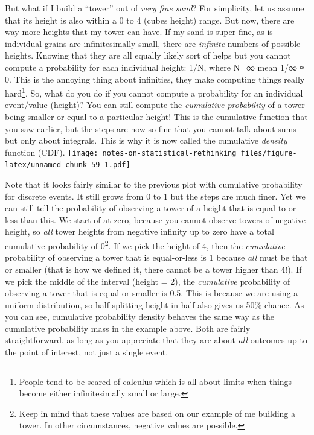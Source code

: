 \documentclass[
]{book}
\begin{document}
But what if I build a ``tower'' out of \emph{very fine sand}? For simplicity, let us assume that its height is also within a 0 to 4 (cubes height) range. But now, there are way more heights that my tower can have. If my sand is super fine, as is individual grains are infinitesimally small, there are \emph{infinite} numbers of possible heights. Knowing that they are all equally likely sort of helps but you cannot compute a probability for each individual height: 1/N, where N=∞ mean 1/∞ ≈ 0. This is the annoying thing about infinities, they make computing things really hard\footnote{People tend to be scared of calculus which is all about limits when things become either infinitesimally small or large.}. So, what do you do if you cannot compute a probability for an individual event/value (height)? You can still compute the \emph{cumulative probability} of a tower being smaller or equal to a particular height! This is the cumulative function that you saw earlier, but the steps are now so fine that you cannot talk about sums but only about integrals. This is why it is now called the cumulative \emph{density} function (CDF).
\texttt{[image: notes-on-statistical-rethinking\_files/figure-latex/unnamed-chunk-59-1.pdf]}

Note that it looks fairly similar to the previous plot with cumulative probability for discrete events. It still grows from 0 to 1 but the steps are much finer. Yet we can still tell the probability of observing a tower of a height that is equal to or less than this. We start of at zero, because you cannot observe towers of negative height, so \emph{all} tower heights from negative infinity up to zero have a total cumulative probability of 0\footnote{Keep in mind that these values are based on our example of me building a tower. In other circumstances, negative values are possible.}. If we pick the height of 4, then the \emph{cumulative} probability of observing a tower that is equal-or-less is 1 because \emph{all} must be that or smaller (that is how we defined it, there cannot be a tower higher than 4!). If we pick the middle of the interval (height = 2), the \emph{cumulative} probability of observing a tower that is equal-or-smaller is 0.5. This is because we are using a uniform distribution, so half splitting height in half also gives us 50\% chance. As you can see, cumulative probability density behaves the same way as the cumulative probability mass in the example above. Both are fairly straightforward, as long as you appreciate that they are about \emph{all} outcomes up to the point of interest, not just a single event.
\end{document}
